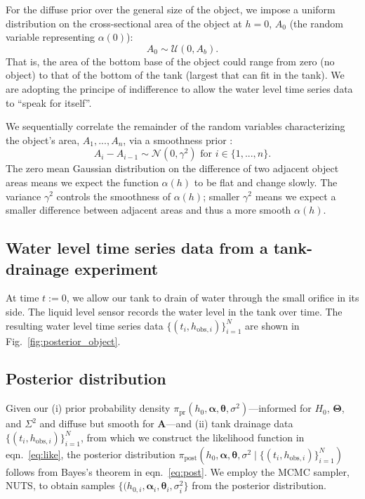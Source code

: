 \documentclass[openacc]{rsproca_new}%
\newcommand\thedata {$\{(t_i,h_{\text{obs}, i})\}_{i=1}^{N}$\xspace}
\newcommand\thedatanomath {\{(t_i,h_{\text{obs}, i})\}_{i=1}^{N}}
\begin{document}
For the diffuse prior over the general size of the object, we impose a uniform distribution on the cross-sectional area of the object at $h=0$, $A_0$ (the random variable representing $\alpha(0)$):
\begin{equation}
	A_0 \sim \mathcal{U}(0, A_b).
\end{equation}
That is, the area of the bottom base of the object could range from zero (no object) to that of the bottom of the tank (largest that can fit in the tank). We are adopting the principe of indifference to allow the water level time series data to ``speak for itself''. 

We sequentially correlate the remainder of the random variables characterizing the object's area, $A_1, ..., A_n$, via a smoothness prior \cite{calvetti2018inverse}: 
\begin{equation}
 A_i - A_{i-1} \sim \mathcal{N}(0, \gamma^2) \text{ for } i \in \{1, ..., n\}.
\end{equation} 
The zero mean Gaussian distribution on the difference of two adjacent object areas means we expect the function $\alpha(h)$ to be flat and change slowly. 
The variance $\gamma^2$ controls the smoothness of $\alpha(h)$; smaller $\gamma^2$ means we expect a smaller difference between adjacent areas and thus a more smooth $\alpha(h)$. 


\subsection{Water level time series data from a tank-drainage experiment}
At time $t:=0$, we allow our tank to drain of water through the small orifice in its side. The liquid level sensor records the water level in the tank over time. The resulting water level time series data \thedata are shown in Fig.~\ref{fig:posterior_object}.

\subsection{Posterior distribution}
Given our (i) prior probability density $\pi_{\text{pr}}(h_0, \boldsymbol \alpha, \boldsymbol \theta, \sigma^2)$---informed for $H_0$, $\boldsymbol \Theta$, and $\Sigma^2$ and diffuse but smooth for $\mathbf{A}$---and (ii) tank drainage data \thedata, from which we construct the likelihood function in eqn.~\ref{eq:like}, the posterior distribution $\pi_{\text{post}}(h_0, \boldsymbol \alpha, \boldsymbol \theta, \sigma^2 \mid \thedatanomath)$ follows from Bayes's theorem in eqn.~\ref{eq:post}. 
We employ the MCMC sampler, NUTS, to obtain samples $\{(h_{0,i}, \boldsymbol \alpha_i, \boldsymbol \theta_i, \sigma^2_i\}$ from the posterior distribution. 
\end{document}
